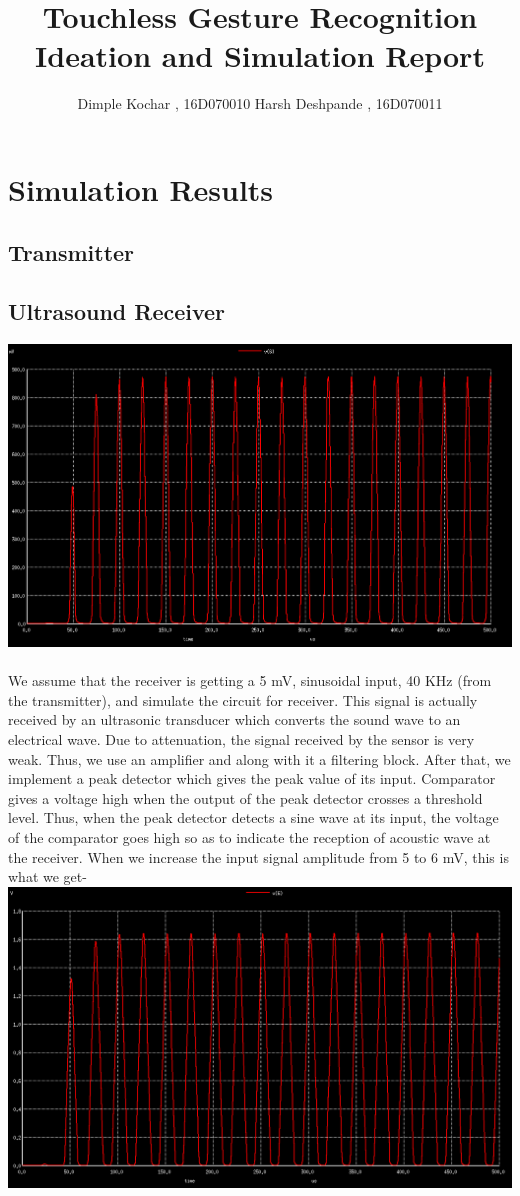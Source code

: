 \documentclass[12pt]{article}
\title{Touchless Gesture Recognition Ideation and Simulation Report}
\author{Dimple Kochar , 16D070010 Harsh Deshpande , 16D070011 }
\begin{document}
\maketitle
\section{Simulation Results}
\subsection{Transmitter}
\subsection{Ultrasound Receiver}
\includegraphics[scale=0.3]{rec.png} \\ \\
We assume that the receiver is getting a 5 mV, sinusoidal input, 40 KHz (from the transmitter), and simulate the circuit for receiver.  This signal is actually
received by an ultrasonic transducer which converts the sound wave to an electrical wave.
Due to attenuation, the signal received by the sensor is very weak. Thus, we use an amplifier and along with it a
filtering block. After that, we implement a peak detector which gives the peak value of its input. Comparator
gives a voltage high when the output of the peak detector
crosses a threshold level. Thus, when the peak detector detects
a sine wave at its input, the voltage of the comparator goes
high so as to indicate the reception of acoustic wave at the
receiver. When we increase the input signal amplitude from 5 to 6 mV, this is what we get-\\
\includegraphics[scale=0.3]{r.png}\\ \\
\end{document}
